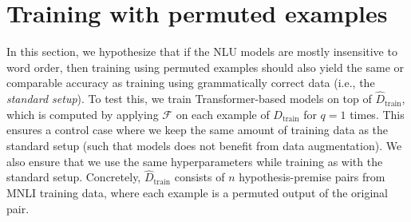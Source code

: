 \documentclass[11pt,a4paper]{article}
\begin{document}



\section{Training with permuted examples}

In this section, we hypothesize that if the NLU models are mostly insensitive to word order, then training using permuted examples should also yield the same or comparable accuracy as training using grammatically correct data (i.e., the \textit{standard setup}). To test this, we train Transformer-based models on top of $\hat{D}_{\text{train}}$, which is computed by applying $\mathcal{F}$ on each example of $D_{\text{train}}$ for $q=1$ times. This ensures a control case where we keep the same amount of training data as the standard setup (such that models does not benefit from data augmentation). We also ensure that we use the same hyperparameters while training as with the standard setup. Concretely, $\hat{D}_{\text{train}}$ consists of $n$ hypothesis-premise pairs from MNLI training data, where each example is a permuted output of the original pair. 
\end{document}
